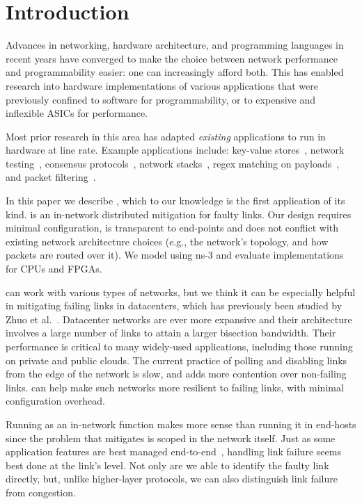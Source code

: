 \section{Introduction}
Advances in networking, hardware architecture, and programming
languages in recent years have converged to make the choice between
network performance and programmability easier: one can increasingly
afford both.
This has enabled research into hardware implementations of various
applications that were previously confined to software for
programmability, or to expensive and inflexible ASICs for performance.

Most prior research in this area has adapted \emph{existing}
applications to run in hardware at line rate.
Example applications include:
key-value stores~\cite{Li:2017:KHI:3132747.3132756},
network testing~\cite{Shahbaz:2013:AOS:2537857.2537880},
consensus protocols~\cite{Istvan:2016:CBI:2930611.2930639},
network stacks~\cite{Istvan:2016:CBI:2930611.2930639},
regex matching on payloads~\cite{Woods:2010:CED:1920841.1920926},
and packet filtering~\cite{Fiessler:2016:HVH:2881025.2881033}.

In this paper we describe \OurSys, which to our knowledge is the first application
of its kind. \OurSys is an in-network distributed
mitigation for faulty links.  
Our design requires
minimal configuration, is transparent to
end-points and does not conflict
with existing network architecture choices (e.g., the network's topology,
and how packets are routed over it). We model \OurSys using ns-3 and evaluate
implementations for CPUs and FPGAs.

\OurSys can work with various types of networks, but we think it can
be especially helpful in mitigating failing links in datacenters,
which has previously been studied by Zhuo et
al.~\cite{Zhuo:2017:UMP:3098822.3098849}.
Datacenter networks are ever more expansive and their architecture
involves a large number of links to attain a larger bisection
bandwidth. Their performance is critical to many widely-used
applications, including those running on private and public clouds.
The current practice of polling and disabling links from the edge of
the network is slow, and adds more contention over non-failing links.
\OurSys can help make such networks more resilient to failing links, with minimal configuration overhead.

Running \OurSys as an in-network function makes more sense than
running it in end-hosts since the problem that \OurSys mitigates is
scoped in the network itself. Just as some application features are
best managed end-to-end~\cite{Saltzer84end-to-endarguments}, handling
link failure seems best done at the link's level. Not only are we able to
identify the faulty link directly, but, unlike higher-layer protocols,
we can also distinguish link failure from congestion.

